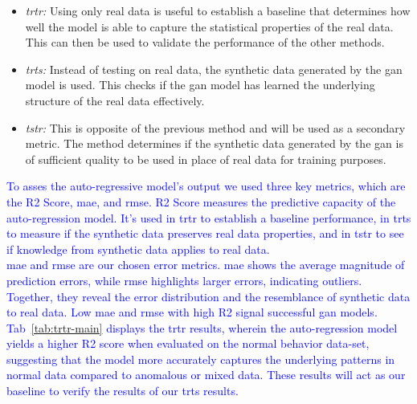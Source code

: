 
\begin{itemize}
    \item \textit{\gls*{trtr}:} Using only real data is useful to establish a baseline that determines how well the model is able to capture the statistical properties of the real data. This can then be used to validate the performance of the other methods.
    \item \textit{\gls*{trts}:} Instead of testing on real data, the synthetic data generated by the 
    \gls*{gan} model is used. This checks if the \gls*{gan} model has learned the underlying structure of the real data effectively.
    \item \textit{\gls*{tstr}:} This is opposite of the previous method and will be used as a secondary metric. The method determines if the synthetic data generated by the \gls*{gan} is of sufficient quality to be used in place of real data for training purposes.
\end{itemize}
\textcolor{blue}{ To asses the auto-regressive model's output we used three key metrics, which are the R2 Score, \gls*{mae}, and \gls*{rmse}. R2 Score measures the predictive capacity of the auto-regression model. It's used in \gls*{trtr} to establish a baseline performance, in \gls*{trts} to measure if the synthetic data preserves real data properties, and in \gls*{tstr} to see if knowledge from synthetic data applies to real data.
\\
\gls*{mae} and \gls*{rmse} are our chosen error metrics. \gls*{mae}  shows the average magnitude of prediction errors, while \gls*{rmse} highlights larger errors, indicating outliers. Together, they reveal the error distribution and the resemblance of synthetic data to real data. Low \gls*{mae} and \gls*{rmse} with high R2 signal successful \gls*{gan} models.
\\
Tab~\ref{tab:trtr-main} displays the \gls*{trtr} results, wherein the auto-regression model yields a higher R2 score when evaluated on the normal behavior data-set, suggesting that the model more accurately captures the underlying patterns in normal data compared to anomalous or mixed data. These results will act as our baseline to verify the results of our \gls*{trts} results.}

